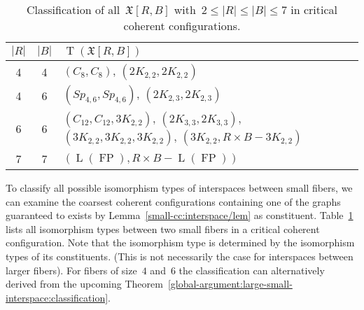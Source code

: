 \documentclass[english,a4paper]{article}
\theoremstyle{plain}
\theoremstyle{definition}
\newcommand{\abs}[1]{| #1 |}
\newcommand{\coherentConfig}{\ensuremath{\mathfrak{X}}}
\newcommand{\interspace}[2]{\ensuremath{\coherentConfig[#1,#2]}}
\DeclareMathOperator*{\Type}{T}
\newcommand{\type}[1]{\ensuremath{\Type\left(#1\right)}}
\newcommand{\clique}[1]{\ensuremath{K_{#1}}}
\newcommand{\cycle}[1]{\ensuremath{C_{#1}}}
\newcommand{\disjointCliques}[2]{\ensuremath{#1 \clique{#2}}}
\DeclareMathOperator{\fanoPlane}{FP}
\DeclareMathOperator{\LeviGraph}{L}
\newcommand{\leviGraph}[1]{\ensuremath{\LeviGraph\!\left(#1\right)}}
\newcommand{\leviFano}{\leviGraph{\fanoPlane}}
\newcommand{\interspaceFourSix}{\ensuremath{Sp_{4,6}}}
\begin{document}
\begin{table}
    \centering{}\begin{tabular}{|c|c|l|}
        \hline
        $\abs{R}$ & $\abs{B}$ & $\type{\interspace{R}{B}}$ \\ \hline
        4 & 4 & $(\cycle{8}, \cycle{8})$, $(\disjointCliques{2}{2,2}, \disjointCliques{2}{2,2})$\\ \hline
        4 & 6 & $(\interspaceFourSix, \interspaceFourSix)$, $(\disjointCliques{2}{2,3},\disjointCliques{2}{2,3})$\\ \hline
        6 & 6 & $(\cycle{12}, \cycle{12}, \disjointCliques{3}{2,2})$, $(\disjointCliques{2}{3,3},\disjointCliques{2}{3,3})$, $(\disjointCliques{3}{2,2}, \disjointCliques{3}{2,2}, \disjointCliques{3}{2,2})$, $(\disjointCliques{3}{2,2},R \times B - \disjointCliques{3}{2,2})$ \\ \hline
        7 & 7 & $(\leviFano, R \times B -\leviFano)$ \\ \hline
    \end{tabular}
    \caption{Classification of all~$\interspace{R}{B}$ with~$2 \leq \abs{R} \leq \abs{B} \leq 7$ in critical coherent configurations.}
    \label{small-cc:classificaiton-small-interspaces/tab}
\end{table}
 

To classify all possible isomorphism types of interspaces between small fibers, we can examine the coarsest coherent configurations containing one of the graphs guaranteed to exists by Lemma~\ref{small-cc:interspace/lem} as constituent. Table~\ref{small-cc:classificaiton-small-interspaces/tab} lists all isomorphism types between two small fibers in a critical coherent configuration. Note that the isomorphism type is determined by the isomorphism types of its constituents. (This is not necessarily the case for interspaces between larger fibers). For fibers of size~$4$ and~$6$ the classification can alternatively derived from the upcoming Theorem~\ref{global-argument:large-small-interspace:classification}.
\end{document}
